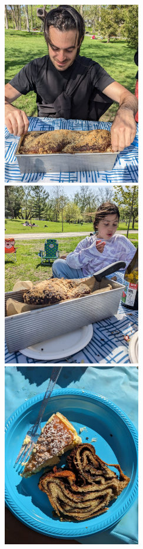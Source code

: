 \begin{figure}
  \includegraphics[width=60mm]{velsa/images/PXL_20230513_193701113.jpg}
  \label{fig:marginfig}
  \includegraphics[width=60mm]{velsa/images/PXL_20230513_194822519.jpg}
  \label{fig:marginfig}
  \includegraphics[width=60mm]{velsa/images/Babka at picnic.jpg}
  \label{fig:marginfig}
\end{figure}


